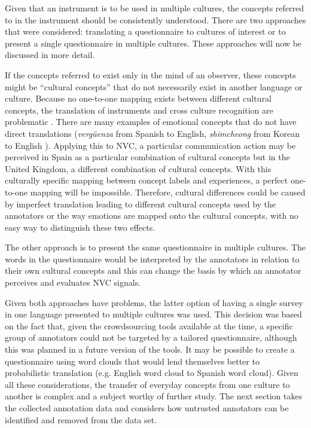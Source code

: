 Given that an instrument is to be used in multiple cultures, the concepts referred to in the instrument should be consistently understood. There are two approaches that were considered: translating a questionnaire to cultures of interest or to present a single questionnaire in multiple cultures. These approaches will now be discussed in more detail.

If the concepts referred to exist only in the mind of an observer, these concepts might be ``cultural concepts'' that do not necessarily exist in another language or culture. Because no one-to-one mapping exists between different cultural concepts, the translation of instruments and cross culture recognition are problematic \cite{Elfenbein2002}. There are many examples of emotional concepts that do not have direct translations (\textit{verg\"{u}enza} from Spanish to English, \textit{shimcheong} from Korean to English \cite{Mendoza2008}). Applying this to \ac{NVC}, a particular communication action may be perceived in Spain as a particular combination of cultural concepts but in the United Kingdom, a different combination of cultural concepts. With this culturally specific mapping between concept labels and experiences, a perfect one-to-one mapping will be impossible. Therefore, cultural differences could be caused by imperfect translation leading to different cultural concepts used by the annotators or the way emotions are mapped onto the cultural concepts, with no easy way to distinguish these two effects. 

The other approach is to present the same questionnaire in multiple cultures. The words in the questionnaire would be interpreted by the annotators in relation to their own cultural concepts and this can change the basis by which an annotator perceives and evaluates \ac{NVC} signals. %

Given both approaches have problems, the latter option of having a single survey in one language presented to multiple cultures was used. This decision was based on the fact that, given the crowdsourcing tools available at the time, a specific group of annotators could not be targeted by a tailored questionnaire, although this was planned in a future version of the tools. It may be possible to create a questionnaire using word clouds that would lend themselves better to probabilistic translation (e.g. English word cloud to Spanish word cloud). Given all these considerations, the transfer of everyday concepts from one culture to another is complex and a subject worthy of further study. The next section takes the collected annotation data and considers how untrusted annotators can be identified and removed from the data set.

